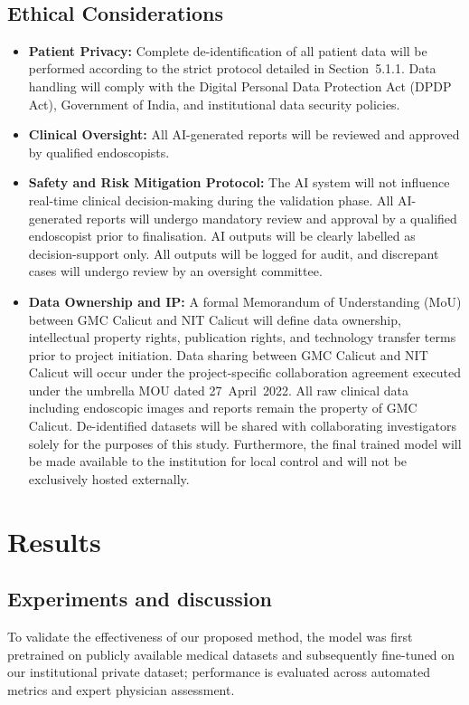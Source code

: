 ﻿﻿\documentclass[12pt]{report}
\begin{document}
\section{Ethical Considerations}
\begin{itemize}
  \item \textbf{Patient Privacy:} Complete de-identification of all patient data will be performed according to the strict protocol detailed in Section~5.1.1. Data handling will comply with the Digital Personal Data Protection Act (DPDP Act), Government of India, and institutional data security policies.
  \item \textbf{Clinical Oversight:} All AI-generated reports will be reviewed and approved by qualified endoscopists.
  \item \textbf{Safety and Risk Mitigation Protocol:} The AI system will not influence real-time clinical decision-making during the validation phase. All AI-generated reports will undergo mandatory review and approval by a qualified endoscopist prior to finalisation. AI outputs will be clearly labelled as decision-support only. All outputs will be logged for audit, and discrepant cases will undergo review by an oversight committee.
  \item \textbf{Data Ownership and IP:} A formal Memorandum of Understanding (MoU) between GMC Calicut and NIT Calicut will define data ownership, intellectual property rights, publication rights, and technology transfer terms prior to project initiation. Data sharing between GMC Calicut and NIT Calicut will occur under the project-specific collaboration agreement executed under the umbrella MOU dated 27~April~2022. All raw clinical data including endoscopic images and reports remain the property of GMC Calicut. De-identified datasets will be shared with collaborating investigators solely for the purposes of this study. Furthermore, the final trained model will be made available to the institution for local control and will not be exclusively hosted externally.
\end{itemize}

\chapter{Results}
\section{Experiments and discussion}
To validate the effectiveness of our proposed method, the model was first pretrained on publicly available medical datasets and subsequently fine-tuned on our institutional private dataset; performance is evaluated across automated metrics and expert physician assessment.
\end{document}
